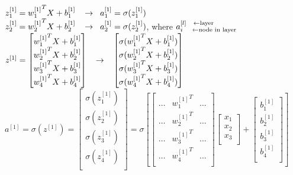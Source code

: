 \documentclass{article}
\begin{document}
$z_{1}^{[1]} = {w_{1}^{[1]}}^T X + b_{1}^{[1]}\hspace{3mm} \rightarrow\hspace{2mm} a_{1}^{[1]} = \sigma(z_{1}^{[1]})$\\

$z_{2}^{[1]} = {w_{2}^{[1]}}^T X + b_{2}^{[1]}\hspace{3mm} \rightarrow\hspace{2mm} a_{2}^{[1]} = \sigma(z_{2}^{[1]})$, \hspace{2mm} where $a_{i \hspace{4mm}\leftarrow \text{node in layer}}^{[l] \hspace{3mm}\leftarrow \text{layer}}$\\

$z^{[1]}=
\begin{bmatrix}
{w_{1}^{[1]}}^T X +b_{1}^{[1]} \\
{w_{2}^{[1]}}^T X +b_{2}^{[1]} \\
{w_{3}^{[1]}}^T X +b_{3}^{[1]} \\
{w_{4}^{[1]}}^T X +b_{4}^{[1]} \\
\end{bmatrix}
\hspace{3mm} \rightarrow
\hspace{3mm}
\begin{bmatrix}
\sigma({w_{1}^{[1]}}^T X +b_{1}^{[1]}) \\
\sigma({w_{2}^{[1]}}^T X +b_{2}^{[1]}) \\
\sigma({w_{3}^{[1]}}^T X +b_{3}^{[1]}) \\
\sigma({w_{4}^{[1]}}^T X +b_{4}^{[1]}) \\
\end{bmatrix}$\\


$a^{[1]} = \sigma(z^{[1]})=
\begin{bmatrix}
\sigma(z_{1}^{[1]}) \\
\sigma(z_{2}^{[1]}) \\
\sigma(z_{3}^{[1]}) \\
\sigma(z_{4}^{[1]}) \\
\end{bmatrix} =
\sigma[
\begin{bmatrix}
\dots & {w_{1}^{[1]}}^T & \dots \\
\dots & {w_{2}^{[1]}}^T & \dots \\
\dots & {w_{3}^{[1]}}^T & \dots \\
\dots & {w_{4}^{[1]}}^T & \dots \\
\end{bmatrix}
\begin{bmatrix}
x_{1} \\
x_{2} \\
x_{3} \\
\end{bmatrix} +
\begin{bmatrix}
b_{1}^{[1]} \\
b_{2}^{[1]} \\
b_{3}^{[1]} \\
b_{4}^{[1]} \\
\end{bmatrix}
]
$\\
\end{document}
